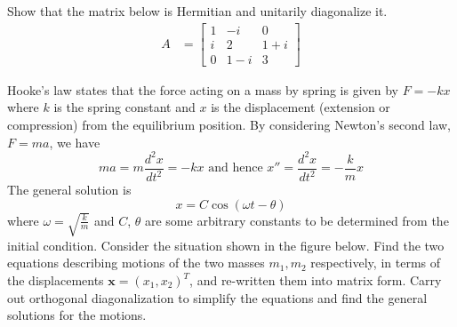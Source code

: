 \begin{Exercise}
Show that the matrix below is Hermitian and unitarily diagonalize it.
\begin{align*}
A &=
\begin{bmatrix}
1 & -i & 0 \\
i & 2 & 1+i \\
0 & 1-i & 3 
\end{bmatrix}
\end{align*}
\end{Exercise}

\begin{Exercise}
Hooke's law states that the force acting on a mass by spring is given by $F = -kx$ where $k$ is the spring constant and $x$ is the displacement (extension or compression) from the equilibrium position. By considering Newton's second law, $F = ma$, we have
\begin{equation*}
ma = m\frac{d^2x}{dt^2} = -kx\text{ and hence }x'' = \frac{d^2x}{dt^2} = -\frac{k}{m}x
\end{equation*}
The general solution is
\begin{equation*}
x = C\cos(\omega t - \theta)
\end{equation*}
where $\omega = \sqrt{\frac{k}{m}}$ and $C$, $\theta$ are some arbitrary constants to be determined from the initial condition. Consider the situation shown in the figure below. Find the two equations describing motions of the two masses $m_1, m_2$ respectively, in terms of the displacements $\textbf{x} = (x_1, x_2)^T$, and re-written them into matrix form. Carry out orthogonal diagonalization to simplify the equations and find the general solutions for the motions.
\begin{center}
\end{center}
\end{Exercise}